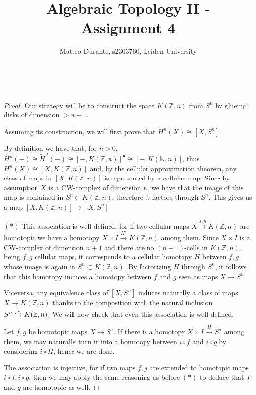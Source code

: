 \documentclass{article}
\newcommand{\numberset}{\mathbb}
\newcommand{\N}{\numberset{N}}
\newcommand{\Z}{\numberset{Z}}
\newcommand{\exercise}[1]{\noindent {\bf Exercise #1}}
\begin{document}
\title{Algebraic Topology II - Assignment 4}

\author{Matteo Durante, s2303760, Leiden University}

\maketitle


~\\
\exercise{3}

\begin{proof}
    Our strategy will be to construct the space $K(\Z,n)$ from $S^n$ by glueing
    disks of dimension $>n+1$.
    
    Assuming its construction, we will first prove that $H^n(X)\cong[X,S^n]$.
    
    By definition we have that, for $n>0$,
    $H^n(-)\cong \tilde{H}^n(-)\cong [-,K(\Z,n)]^\bullet\cong [-,K(\N,n)]$, thus
    $H^n(X)\cong[X,K(\Z,n)]$ and, by the cellular
    approximation theorem, any class of maps in $[X,K(\Z,n)]$ is represented by
    a cellular map. Since by assumption $X$ is a CW-complex of dimension $n$, we
    have that the image of this map is contained in $S^n\subset K(\Z,n)$,
    therefore it factors through $S^n$. This gives us a map
    $[X,K(\Z,n)]\rightarrow[X,S^n]$.
    
    $(*)$ This association is well defined, for if two cellular maps
    $X\xrightarrow{f,g}K(\Z,n)$ are homotopic we have a homotopy $X\times I
    \xrightarrow{H'} K(\Z,n)$ among them. Since $X\times I$ is a CW-complex of
    dimension $n+1$ and there are no
    $(n+1)$-cells in $K(\Z,n)$, being $f,g$ cellular maps, it corresponds to a
    cellular homotopy $H$ between $f,g$ whose image is again in $S^n\subset
    K(\Z,n)$. By factorizing $H$ through $S^n$, it follows that this homotopy
    induces a homotopy between $f$ and $g$ seen as maps $X\rightarrow S^n$.

    Viceversa, any equivalence class of $[X,S^n]$ induces naturally a
    class of maps $X\rightarrow K(\Z,n)$ thanks to the composition with the
    natural inclusion $S^n\xhookrightarrow{i} K(\Z,n)$. We will now check that
    even this association is well defined.
    
    Let $f,g$ be homotopic maps $X\rightarrow S^n$. If there is a homotopy
    $X\times I\xrightarrow{H}S^n$ among them, we
    may naturally turn it into a homotopy between $i\circ f$ and $i\circ g$ by
    considering $i\circ H$, hence we are done.

    The association is injective, for if two maps $f,g$ are extended to
    homotopic maps $i\circ f,i\circ g$, then we may apply the same reasoning as
    before $(*)$ to deduce that $f$ and $g$ are homotopic as well.


\end{proof}
\end{document}
